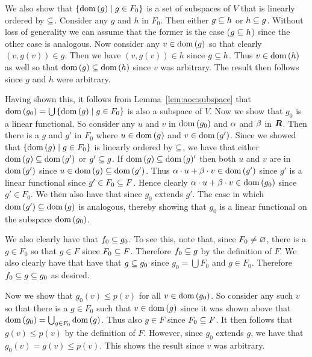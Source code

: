 \begin{questions}
{{      We also show that $\braces{\dom(g) \where g \in F_0}$ is a set of subspaces of $V$ that is linearly ordered by $\ss$.
      Consider any $g$ and $h$ in $F_0$.
      Then either $g \ss h$ or $h \ss g$.
      Without loss of generality we can assume that the former is the case ($g \ss h$) since the other case is analogous.
      Now consider any $v \in \dom(g)$ so that clearly $(v, g(v)) \in g$.
      Then we have $(v, g(v)) \in h$ since $g \ss h$.
      Thus $v \in \dom(h)$ as well so that $\dom(g) \ss \dom(h)$ since $v$ was arbitrary.
      The result then follows since $g$ and $h$ were arbitrary.

      Having shown this, it follows from Lemma~\ref{lem:aoc:subspace} that $\dom(g_0) = \bigcup \braces{\dom(g) \where g \in F_0}$ is also a subspace of $V$.
      Now we show that $g_0$ is a linear functional.
      So consider any $u$ and $v$ in $\dom(g_0)$ and $\a$ and $\b$ in $\reals$.
      Then there is a $g$ and $g'$ in $F_0$ where $u \in \dom(g)$ and $v \in \dom(g')$.
      Since we showed that $\braces{\dom(g) \where g \in F_0}$ is linearly ordered by $\ss$, we have that either $\dom(g) \ss \dom(g')$ or $g' \ss g$.
      If $\dom(g) \ss \dom(g)'$ then both $u$ and $v$ are in $\dom(g')$ since $u \in \dom(g) \ss \dom(g')$.
      Thus $\a \cdot u + \b \cdot v \in \dom(g')$ since $g'$ is a linear functional since $g' \in F_0 \ss F$.
      Hence clearly $\a \cdot u + \b \cdot v \in \dom(g_0)$ since $g' \in F_0$.
      We then also have that
      since $g_0$ extends $g'$.
      The case in which $\dom(g') \ss \dom(g)$ is analogous, thereby showing that $g_0$ is a linear functional on the subspace $\dom(g_0)$.

      We also clearly have that $f_0 \ss g_0$.
      To see this, note that, since $F_0 \neq \es$, there is a $g \in F_0$ so that $g \in F$ since $F_0 \ss F$.
      Therefore $f_0 \ss g$ by the definition of $F$.
      We also clearly have that have that $g \ss g_0$ since $g_0 = \bigcup F_0$ and $g \in F_0$.
      Therefore $f_0 \ss g \ss g_0$ as desired.

      Now we show that $g_0(v) \leq p(v)$ for all $v \in \dom(g_0)$.
      So consider any such $v$ so that there is a $g \in F_0$ such that $v \in \dom(g)$ since it was shown above that $\dom(g_0) = \bigcup_{g \in F_0} \dom(g)$.
      Thus also $g \in F$ since $F_0 \ss F$.
      It then follows that $g(v) \leq p(v)$ by the definition of $F$.
      However, since $g_0$ extends $g$, we have that $g_0(v) = g(v) \leq p(v)$.
      This shows the result since $v$ was arbitrary.

}}
\end{questions}
